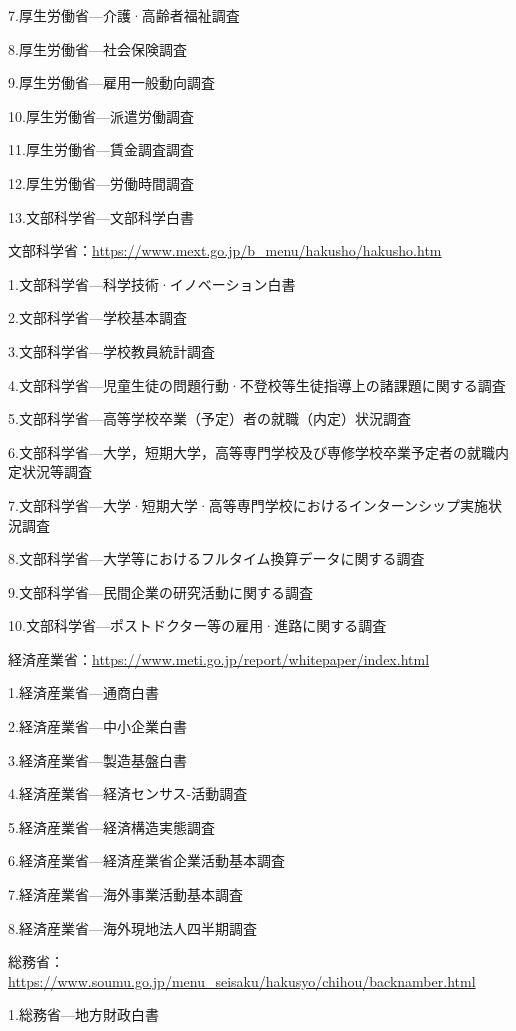7.厚生労働省—介護·高齢者福祉調査

8.厚生労働省—社会保険調査

9.厚生労働省—雇用一般動向調査

10.厚生労働省—派遣労働調査

11.厚生労働省—賃金調査調査

12.厚生労働省—労働時間調査

13.文部科学省—文部科学白書

文部科学省：\url{https://www.mext.go.jp/b_menu/hakusho/hakusho.htm}

1.文部科学省—科学技術·イノベーション白書

2.文部科学省—学校基本調査

3.文部科学省—学校教員統計調査

4.文部科学省—児童生徒の問題行動·不登校等生徒指導上の諸課題に関する調査

5.文部科学省—高等学校卒業（予定）者の就職（内定）状況調査

6.文部科学省—大学，短期大学，高等専門学校及び専修学校卒業予定者の就職内定状況等調査

7.文部科学省—大学·短期大学·高等専門学校におけるインターンシップ実施状況調査

8.文部科学省—大学等におけるフルタイム換算データに関する調査

9.文部科学省—民間企業の研究活動に関する調査

10.文部科学省—ポストドクター等の雇用·進路に関する調査

経済産業省：\url{https://www.meti.go.jp/report/whitepaper/index.html}

1.経済産業省—通商白書

2.経済産業省—中小企業白書

3.経済産業省—製造基盤白書

4.経済産業省—経済センサス-活動調査

5.経済産業省—経済構造実態調査

6.経済産業省—経済産業省企業活動基本調査

7.経済産業省—海外事業活動基本調査

8.経済産業省—海外現地法人四半期調査

総務省：\url{https://www.soumu.go.jp/menu_seisaku/hakusyo/chihou/backnamber.html}

1.総務省—地方財政白書
